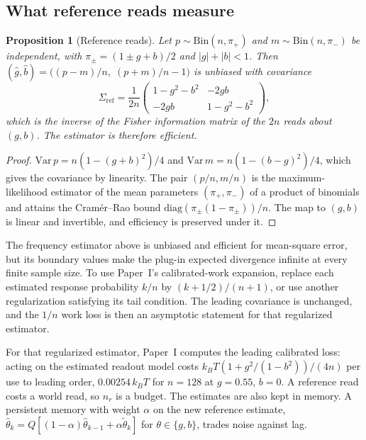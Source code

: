 \documentclass[12pt]{article}
\newtheorem{proposition}[theorem]{Proposition}
\theoremstyle{definition}
\begin{document}
\subsection{What reference reads measure}\label{subsec:reference_fisher}

\begin{proposition}[Reference reads]\label{prop:reference_reads}
Let $p\sim\mathrm{Bin}(n,\pi_+)$ and $m\sim\mathrm{Bin}(n,\pi_-)$ be independent, with $\pi_\pm=(1\pm g+b)/2$ and $|g|+|b|<1$. Then $(\hat g,\hat b)=\bigl((p-m)/n,\;(p+m)/n-1\bigr)$ is unbiased with covariance
\[
\Sigma_{\mathrm{ref}}=\frac1{2n}\begin{pmatrix}1-g^2-b^2&-2gb\\-2gb&1-g^2-b^2\end{pmatrix},
\]
which is the inverse of the Fisher information matrix of the $2n$ reads about $(g,b)$. The estimator is therefore efficient.
\end{proposition}
\begin{proof}
$\mathrm{Var}\,p=n(1-(g+b)^2)/4$ and $\mathrm{Var}\,m=n(1-(b-g)^2)/4$, which gives the covariance by linearity. The pair $(p/n,m/n)$ is the maximum-likelihood estimator of the mean parameters $(\pi_+,\pi_-)$ of a product of binomials and attains the Cram\'er--Rao bound $\mathrm{diag}(\pi_\pm(1-\pi_\pm))/n$. The map to $(g,b)$ is linear and invertible, and efficiency is preserved under it.
\end{proof}

The frequency estimator above is unbiased and efficient for mean-square
error, but its boundary values make the plug-in expected divergence infinite
at every finite sample size. To use Paper~I's calibrated-work expansion,
replace each estimated response probability $k/n$ by
$(k+1/2)/(n+1)$, or use another regularization satisfying its tail condition.
The leading covariance is unchanged, and the $1/n$ work loss is
then an asymptotic statement for that regularized estimator.

For that regularized estimator, Paper~I computes the leading calibrated loss: acting on the estimated readout model costs $k_BT(1+g^2/(1-b^2))/(4n)$ per use to leading order, $0.00254\,k_BT$ for $n=128$ at $g=0.55$, $b=0$. A reference read costs a world read, so $n_r$ is a budget. The estimates are also kept in memory. A persistent memory with weight $\alpha$ on the new reference estimate, $\hat\theta_k=Q[(1-\alpha)\hat\theta_{k-1}+\alpha\tilde\theta_k]$ for $\theta\in\{g,b\}$, trades noise against lag.
\end{document}
